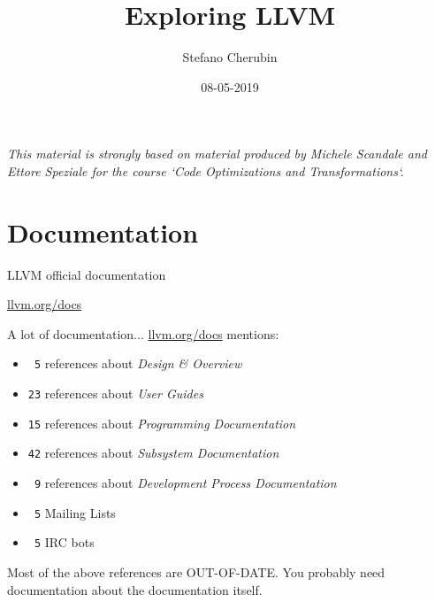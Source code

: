 \documentclass[10pt,mathserif]{beamer}
\author{Stefano Cherubin}
\institute{Politecnico di Milano}
\date{08-05-2019}
\title{Exploring LLVM}
\begin{document}
\begin{frame}
\maketitle
\begin{center}
\itshape\scriptsize This material is strongly based on material produced by
                    Michele Scandale and Ettore Speziale for the course
                    `Code Optimizations and Transformations`.
\end{center}
\end{frame}

\section{Documentation}
\begin{frame}[t]{LLVM official documentation}
  \begin{center}
    \begin{Huge}
      \vfill
      \url{llvm.org/docs}
      \vfill
    \end{Huge}
  \end{center}
\end{frame}

\begin{frame}[t]{A lot of documentation...}
  \url{llvm.org/docs} mentions:
  \begin{itemize}
    \item \texttt{\ 5} references about \textit{Design \& Overview}
    \item \texttt{23} references about \textit{User Guides}
    \item \texttt{15} references about \textit{Programming Documentation}
    \item \texttt{42} references about \textit{Subsystem Documentation}
    \item \texttt{\ 9} references about \textit{Development Process Documentation}
    \item \texttt{\ 5} Mailing Lists
    \item \texttt{\ 5} IRC bots
  \end{itemize}
  \vfill
  Most of the above references are OUT-OF-DATE.
  \vfill
  You probably need documentation about the documentation itself.
  \vfill
\end{frame}
\end{document}
